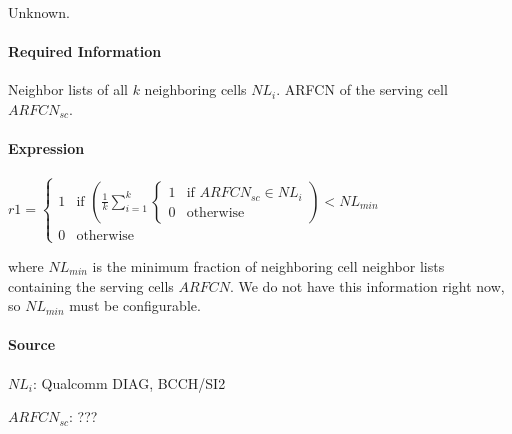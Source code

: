 \documentclass[a4paper,11pt,notitlepage,bigheadings,oneside]{scrartcl}
\begin{document}
Unknown.

\paragraph{Required Information}

Neighbor lists of all $k$ neighboring cells $NL_i$. ARFCN of the serving cell
$ARFCN_{sc}$.

\paragraph{Expression}

$r1 =
\begin{cases}
	1 & \text{if } \left(\frac{1}{k}\displaystyle\sum_{i=1}^{k}
                                \begin{cases}
	                                1 & \text{if } ARFCN_{sc} \in NL_i \\
	                                0 & \text{otherwise}
                                \end{cases}\right) < NL_{min} \\
        0 & \text{otherwise}
        \end{cases}
$

where $NL_{min}$ is the minimum fraction of neighboring cell neighbor lists
containing the serving cells $ARFCN$. We do not have this information right
now, so $NL_{min}$ must be configurable.

\paragraph{Source}

$NL_i$: Qualcomm DIAG, BCCH/SI2




$ARFCN_{sc}$: ???


\subsubsection{}
\end{document}
